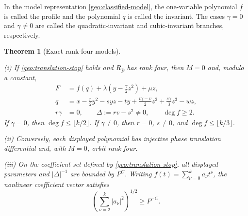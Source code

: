 \documentclass[11pt]{amsart}
\newtheorem{theorem}{Theorem}[section]
\theoremstyle{definition}
\theoremstyle{remark}
\numberwithin{equation}{section}
\begin{document}
In the model representation \eqref{geo:classified-model}, the one-variable polynomial $f$ is called the profile and the polynomial $q$ is called the invariant. The cases $\gamma=0$ and $\gamma\ne0$ are called the quadratic-invariant and cubic-invariant branches, respectively.
\begin{theorem}[Exact rank-four models]\label{geo:classification}

\leavevmode\noindent\textup{(i)} If \eqref{geo:translation-stop} holds and $R_{\widehat F}$ has rank four, then $M=0$ and, modulo a constant,
\begin{equation}\label{geo:classified-model}
\begin{split}
F&=f(q)+\lambda\left(y-\frac\gamma2z^2\right)+\mu z,\\
q&=x-\frac r2y^2-syz-ty+\frac{t\gamma-v}{2}z^2+\frac{s\gamma}{3}z^3-wz,\\
r\gamma&=0,\qquad \Delta:=rv-s^2\ne0,\qquad \deg f\ge2.
\end{split}
\end{equation}
If $\gamma=0$, then $\deg f\le\lfloor k/2\rfloor$. If $\gamma\ne0$, then $r=0$, $s\ne0$, and $\deg f\le\lfloor k/3\rfloor$.

\noindent\textup{(ii)} Conversely, each displayed polynomial has injective phase translation differential and, with $M=0$, orbit rank four.

\noindent\textup{(iii)} On the coefficient set defined by \eqref{geo:translation-stop}, all displayed parameters and $|\Delta|^{-1}$ are bounded by $P^C$. Writing $f(t)=\sum_{\nu=0}^k a_\nu t^\nu$, the nonlinear coefficient vector satisfies
\[
\left(\sum_{\nu=2}^k|a_\nu|^2\right)^{1/2}\ge P^{-C}.
\]
\end{theorem}
\end{document}
